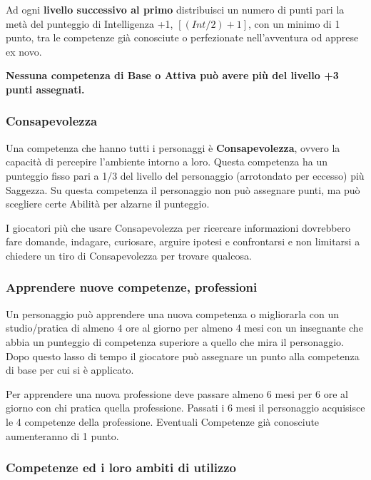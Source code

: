 \begin{multicols}{2}

Ad ogni \textbf{livello successivo al primo} distribuisci un numero di punti pari la metà del punteggio di Intelligenza +1, $[(Int/2)+1]$, con un minimo di 1 punto, tra le competenze già conosciute o perfezionate nell'avventura od apprese ex novo.

\textbf{Nessuna competenza di Base o Attiva può avere più del livello +3 punti assegnati.}


\subsubsection{Consapevolezza}\label{consapevolezza}

Una competenza che hanno tutti i personaggi è \textbf{Consapevolezza}, ovvero la capacità di percepire l'ambiente intorno a loro. Questa competenza ha un punteggio fisso pari a 1/3 del livello del personaggio (arrotondato per eccesso) più Saggezza. Su questa competenza il personaggio non può assegnare punti, ma può scegliere certe Abilità per alzarne il punteggio.

I giocatori più che usare Consapevolezza per ricercare informazioni dovrebbero fare domande, indagare, curiosare, arguire ipotesi e confrontarsi e non limitarsi a chiedere un tiro di Consapevolezza per trovare qualcosa.

\subsubsection{Apprendere nuove competenze, professioni}\label{apprenderenuovecompetenze}

Un personaggio può apprendere una nuova competenza o migliorarla con un studio/pratica di almeno 4 ore al giorno per almeno 4 mesi con un insegnante che abbia un punteggio di competenza superiore a quello che mira il personaggio. Dopo questo lasso di tempo il giocatore può assegnare un punto alla competenza di base per cui si è applicato.

Per apprendere una nuova professione deve passare almeno 6 mesi per 6 ore al giorno con chi pratica quella professione. Passati i 6 mesi il personaggio acquisisce le 4 competenze della professione. Eventuali Competenze già conosciute aumenteranno di 1 punto.

\subsubsection{Competenze ed i loro ambiti di utilizzo}\label{competenzeambitidiutilizzo}


\end{multicols}
